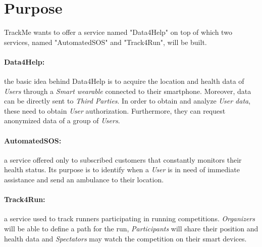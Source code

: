 \documentclass[../../rasd.tex]{subfiles}
\begin{document}
\section{Purpose}
			
			TrackMe wants to offer a service named "Data4Help" on top of which two services, named "AutomatedSOS" and "Track4Run", will be built.
			\paragraph{Data4Help:} the basic idea behind Data4Help is to acquire the location and health data of \textit{Users} through a \textit{Smart wearable} connected to their smartphone. Moreover, data can be directly sent to \textit{Third Parties}. In order to obtain and analyze \textit{User data}, these need to obtain \textit{User} authorization. Furthermore, they can request anonymized data of a group of \textit{Users}.
			
			\paragraph{AutomatedSOS:} a service offered only to subscribed customers that constantly monitors their health status. Its purpose is to identify when a \textit{User} is in need of immediate assistance and send an ambulance to their location.
			
			\paragraph{Track4Run:} a service used to track runners participating in running competitions. \textit{Organizers} will be able to define a path for the run, \textit{Participants} will share their position and health data and \textit{Spectators} may watch the competition on their smart devices.
\end{document}
